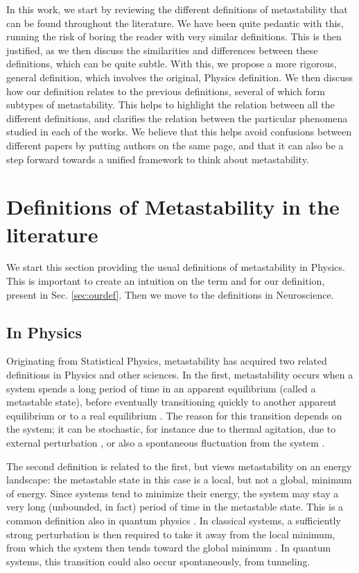 \documentclass[preprint,superscriptaddress,showpacs,amsmath,amssymb,aps,pre,floatfix]{revtex4-1}
\theoremstyle{definition}
\begin{document}
In this work, we start by reviewing the different definitions of metastability that can be found throughout the literature. We have been quite pedantic with this, running the risk of boring the reader with very similar definitions. This is then justified, as we then discuss the similarities and differences between these definitions, which can be quite subtle. With this, we propose a more rigorous, general definition, which involves the original, Physics definition. We then discuss how our definition relates to the previous definitions, several of which form subtypes of metastability. This helps to highlight the relation between all the different definitions, and clarifies the relation between the particular phenomena studied in each of the works. We believe that this helps avoid confusions between different papers by putting authors on the same page, and that it can also be a step forward towards a unified framework to think about metastability.



\section{Definitions of Metastability in the literature}
We start this section providing the usual definitions of metastability in Physics. This is important to create an intuition on the term and for our definition, present in Sec. \ref{sec:ourdef}. Then we move to the definitions in Neuroscience. 

\subsection{In Physics}
\label{sec:physdef}
Originating from Statistical Physics, metastability has acquired two related definitions in Physics and other sciences.
In the first, metastability occurs when a system spends a long period of time in an apparent equilibrium (called a metastable state), before eventually transitioning quickly to another apparent equilibrium or to a real equilibrium \cite{olivieri_2005, bovier_2009, hollander_2009}. The reason for this transition depends on the system; it can be stochastic, for instance due to thermal agitation, due to external perturbation \cite{bovier_2009, hollander_2009}, or also a spontaneous fluctuation from the system \cite{olivieri_2005}.

The second definition is related to the first, but views metastability on an energy landscape: the metastable state in this case is a local, but not a global, minimum of energy. Since systems tend to minimize their energy, the system may stay a very long (unbounded, in fact) period of time in the metastable state. This is a common definition also in quantum physics \cite{makela_1997, gunton_1983}. In classical systems, a sufficiently strong perturbation is then required to take it away from the local minimum, from which the system then tends toward the global minimum \cite{sewell_1980, pathria_2011, reichl_2016, kardar_2007}. In quantum systems, this transition could also occur spontaneously, from tunneling.
\end{document}
